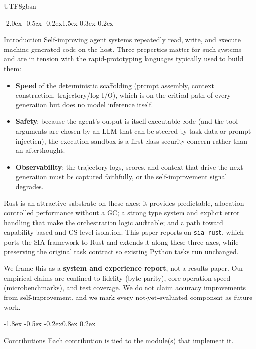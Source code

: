 \documentclass{article}
\makeatletter
\renewcommand{\section}{\@startsection{section}{1}{\z@}%
  {-2.0ex \@plus -0.5ex \@minus -0.2ex}{1.5ex \@plus 0.3ex \@minus 0.2ex}%
  {\large\bfseries\raggedright\color{accent}}}
\renewcommand{\subsection}{\@startsection{subsection}{2}{\z@}%
  {-1.8ex \@plus -0.5ex \@minus -0.2ex}{0.8ex \@plus 0.2ex}%
  {\normalsize\bfseries\raggedright\color{accent}}}
\makeatother
\begin{document}
\begin{CJK}{UTF8}{gbsn}

\section{Introduction}
Self-improving agent systems repeatedly read, write, and execute machine-generated
code on the host. Three properties matter for such systems and are in tension with
the rapid-prototyping languages typically used to build them:

\begin{itemize}
\item \textbf{Speed} of the deterministic scaffolding (prompt assembly, context
  construction, trajectory/log I/O), which is on the critical path of every
  generation but does no model inference itself.
\item \textbf{Safety}: because the agent's output is itself executable code (and the
  tool arguments are chosen by an LLM that can be steered by task data or prompt
  injection), the execution sandbox is a first-class security concern rather than an
  afterthought.
\item \textbf{Observability}: the trajectory logs, scores, and context that drive the
  next generation must be captured faithfully, or the self-improvement signal
  degrades.
\end{itemize}

Rust is an attractive substrate on these axes: it provides predictable,
allocation-controlled performance without a GC; a strong type system and explicit
error handling that make the orchestration logic auditable; and a path toward
capability-based and OS-level isolation. This paper reports on \texttt{sia\_rust},
which ports the SIA framework to Rust and extends it along these three axes, while
preserving the original task contract so existing Python tasks run unchanged.

We frame this as a \textbf{system and experience report}, not a results paper. Our
empirical claims are confined to fidelity (byte-parity), core-operation speed
(microbenchmarks), and test coverage. We do not claim accuracy improvements from
self-improvement, and we mark every not-yet-evaluated component as future work.

\subsection{Contributions}
Each contribution is tied to the module(s) that implement it.


\end{CJK}
\end{document}
